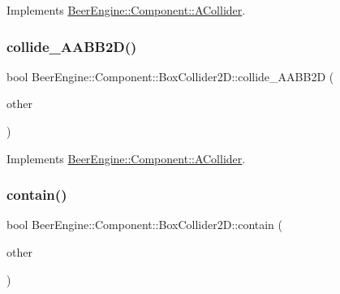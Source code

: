 Implements \mbox{\hyperlink{class_beer_engine_1_1_component_1_1_a_collider_ae972d39620da804c72fb9799c167bf4b}{Beer\+Engine\+::\+Component\+::\+A\+Collider}}.

\mbox{\label{class_beer_engine_1_1_component_1_1_box_collider2_d_a36f2e8987bd65106250ca6eea7003e1b}} 
\subsubsection{\texorpdfstring{collide\+\_\+\+A\+A\+B\+B2\+D()}{collide\_AABB2D()}\hspace{0.1cm}{\footnotesize\ttfamily [2/2]}}
{\footnotesize\ttfamily bool Beer\+Engine\+::\+Component\+::\+Box\+Collider2\+D\+::collide\+\_\+\+A\+A\+B\+B2D (\begin{DoxyParamCaption}\item[{\mbox{\hyperlink{class_beer_engine_1_1_component_1_1_circle_collider}{Circle\+Collider}} $\ast$}]{other }\end{DoxyParamCaption})\hspace{0.3cm}{\ttfamily [virtual]}}



Implements \mbox{\hyperlink{class_beer_engine_1_1_component_1_1_a_collider_ab9acc12bf6017b81f3515264238ce3d5}{Beer\+Engine\+::\+Component\+::\+A\+Collider}}.

\mbox{\label{class_beer_engine_1_1_component_1_1_box_collider2_d_a7147a553f4200c6cf4031af2ddb70154}} 
\subsubsection{\texorpdfstring{contain()}{contain()}}
{\footnotesize\ttfamily bool Beer\+Engine\+::\+Component\+::\+Box\+Collider2\+D\+::contain (\begin{DoxyParamCaption}\item[{glm\+::vec2}]{other }\end{DoxyParamCaption})\hspace{0.3cm}{\ttfamily [virtual]}}



